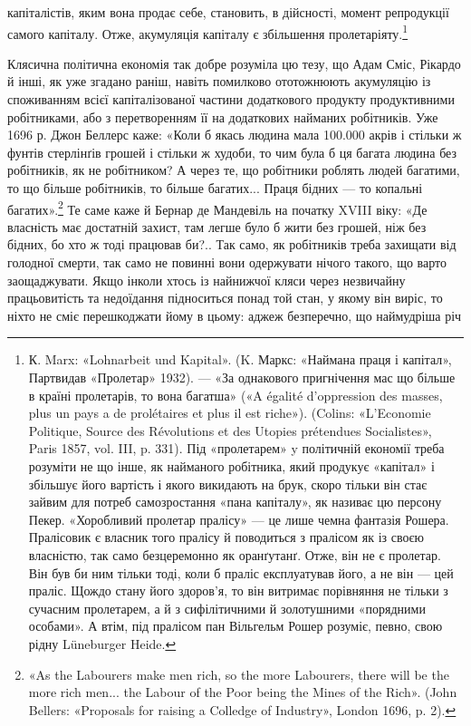капіталістів, яким вона продає себе, становить, в дійсності,
момент репродукції самого капіталу. Отже, акумуляція
капіталу є збільшення пролетаріяту.\footnote{
К. Marx: «Lohnarbeit und Kapital». (K. Маркс: «Наймана праця
і капітал», Партвидав «Пролетар» 1932). — «За однакового пригнічення
мас що більше в країні пролетарів, то вона багатша» («A égalité
d’oppression des masses, plus un pays a de prolétaires et plus il est riche»).
(Colins: «L’Economie Politique, Source des Révolutions et des Utopies
prétendues Socialistes», Paris 1857, vol. III, p. 331). Під «пролетарем»
y політичній економії треба розуміти не що інше, як найманого робітника,
який продукує «капітал» і збільшує його вартість і якого викидають
на брук, скоро тільки він стає зайвим для потреб самозростання
«пана капіталу», як називає цю персону Пекер. «Хоробливий пролетар
пралісу» — це лише чемна фантазія Рошера. Пралісовик є власник того
пралісу й поводиться з пралісом як із своєю власністю, так само безцеремонно
як оранґутанґ. Отже, він не є пролетар. Він був би ним тільки
тоді, коли б праліс експлуатував його, а не він — цей праліс. Щождо
стану його здоров'я, то він витримає порівняння не тільки з сучасним
пролетарем, а й з сифілітичними й золотушними «порядними особами».
А втім, під пралісом пан Вільгельм Рошер розуміє, певно, свою рідну
Lüneburger Heide.
}

Клясична політична економія так добре розуміла цю тезу,
що Адам Сміс, Рікардо й інші, як уже згадано раніш, навіть помилково
ототожнюють акумуляцію із споживанням всієї капіталізованої
частини додаткового продукту продуктивними робітниками,
або з перетворенням її на додаткових найманих робітників.
Уже 1696 р. Джон Беллерс каже: «Коли б якась людина
мала 100.000 акрів і стільки ж фунтів стерлінґів грошей і стільки
ж худоби, то чим була б ця багата людина без робітників, як не
робітником? А через те, що робітники роблять людей багатими,
то що більше робітників, то більше багатих... Праця бідних — то
копальні багатих».\footnote{
«As the Labourers make men rich, so the more Labourers, there
will be the more rich men... the Labour of the Poor being the Mines of the
Rich». (John Bellers: «Proposals for raising a Colledge of Industry», London
1696, p. 2).
} Те саме каже й Бернар де Мандевіль
на початку XVIII віку: «Де власність має достатній захист, там
легше було б жити без грошей, ніж без бідних, бо хто ж тоді
працював би?.. Так само, як робітників треба захищати від голодної
смерти, так само не повинні вони одержувати нічого
такого, що варто заощаджувати. Якщо інколи хтось із найнижчої
кляси через незвичайну працьовитість та недоїдання підноситься
понад той стан, у якому він виріс, то ніхто не сміє перешкоджати
йому в цьому: аджеж безперечно, що наймудріша річ
\parbreak{}  %
